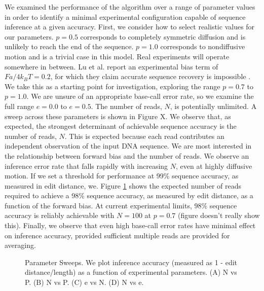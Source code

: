 \documentclass{biophys_letter}
\begin{document}
We examined the performance of the algorithm over a range of parameter values in order to identify a minimal experimental configuration capable of sequence inference at a given accuracy.
First, we consider how to select realistic values for our parameters.
$p=0.5$ corresponds to completely symmetric diffusion and is unlikely to reach the end of the sequence.
$p=1.0$ corresponds to nondiffusive motion and is a trivial case in this model.
Real experiments will operate somewhere in between.
Lu et al. report an experimental bias term of $Fa/4k_{B}T=0.2$, for which they claim accurate sequence recovery is impossible \cite{Lu:2011}.
We take this as a starting point for investigation, exploring the range $p=0.7$ to $p=1.0$.
We are unsure of an appropriate base-call error rate, so we examine the full range $e=0.0$ to $e=0.5$.
The number of reads, $N$, is potentially unlimited.
A sweep across these parameters is shown in Figure X.
We observe that, as expected, the strongest determinant of achievable sequence accuracy is the number of reads, $N$.
This is expected because each read contributes an independent observation of the input DNA sequence.
We are most interested in the relationship between forward bias and the number of reads.
We observe an inference error rate that falls rapidly with increasing $N$, even at highly diffusive motion. 
If we set a threshold for performance at 99\% sequence accuracy, as measured in edit distance, we.
Figure \ref{fig:parameter_sweeps} shows the expected number of reads required to achieve a 98\% sequence accuracy, as measured by edit distance, as a function of the forward bias.
At current experimental limits, 98\% sequence accuracy is reliably achievable with $N=100$ at $p=0.7$ (figure doesn't really show this).
Finally, we observe that even high base-call error rates have minimal effect on inference accuracy, provided sufficient multiple reads are provided for averaging.

\begin{figure}
\caption{Parameter Sweeps. We plot inference accuracy (measured as 1 - edit distance/length) as a function of experimental parameters. (A) N vs P. (B) N vs P. (C) e vs N. (D) N vs e.}
\label{fig:parameter_sweeps}
\end{figure}
\end{document}
